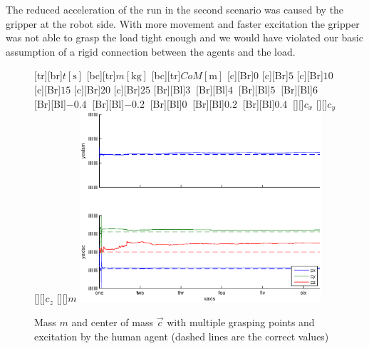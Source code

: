 The reduced acceleration of the run in the second scenario was caused by the gripper at the robot side. With more movement and faster excitation the gripper was not able to grasp the load tight enough and we would have violated our basic assumption of a rigid connection between the agents and the load.

\begin{figure}
	\centering	
	[tr][br]{$t\left[\mathrm{s}\right]$}
	[bc][tr]{$m\left[\mathrm{kg}\right]$}
	[bc][tr]{$CoM\left[\mathrm{m}\right]$}
	[Br]{$0$}
	[Br]{$5$}
	[Br]{$10$}
	[Br]{$15$}
	[Br]{$20$}
	[Br]{$25$}
	[Br][Bl]{$3\  $}
	[Br][Bl]{$4\ $}
	[Br][Bl]{$5\  $}
	[Br][Bl]{$6\  $}
	[Br][Bl]{$-0.4\  $}
	[Br][Bl]{$-0.2\ $}
	[Br][Bl]{$0\  $}
	[Br][Bl]{$0.2\  $}
	[Br][Bl]{$0.4\  $}
	[][]{\tiny $c_x$}
	[][]{\tiny $c_y$}
	[][]{\tiny $c_z$}
	[][]{\tiny $m$}
	\includegraphics[width=0.8\textwidth]{figures/multiple_grasping_points_human_mass_and_cog.eps}
	\vspace{0.2cm}
	\caption[Mass error, multiple grasping points, excitation by human agent]{Mass $m$ and center of mass $\vec{c}$ with multiple grasping points and excitation by the human agent (dashed lines are the correct values)}
	\label{fig:estim_mass_multi_human}
\end{figure}

